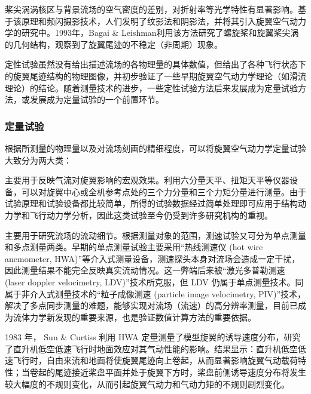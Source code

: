 桨尖涡涡核区与背景流场的空气密度的差别，对折射率等光学特性有显著影响。基于该原理和频闪摄影技术，人们发明了纹影法和阴影法，并将其引入旋翼空气动力学的研究中。1993年，Bagai
\& Leishman利用该方法研究了螺旋桨和旋翼桨尖涡的几何结构，观察到了旋翼尾迹的不稳定（非周期）现象。

定性试验虽然没有给出描述流场的各物理量的具体数值，但给出了各种飞行状态下的旋翼尾迹结构的物理图像，并初步验证了一些早期旋翼空气动力学理论（如滑流理论）的结论。随着测量技术的进步，一些定性试验方法后来发展成为定量试验方法，或发展成为定量试验的一个前置环节。

\subsubsection{定量试验}

根据所测量的物理量以及对流场刻画的精细程度，可以将旋翼空气动力学定量试验大致分为两大类：
\begin{description}[wide]
\item [{测力试验}] 主要用于反映气流对旋翼影响的宏观效果。利用六分量天平、扭矩天平等仪器设备，可以对旋翼中心或全机参考点处的三个力分量和三个力矩分量进行测量。由于试验原理和试验设备都比较简单，所得的试验数据经过简单处理即可应用于结构动力学和飞行动力学分析，因此这类试验至今仍受到许多研究机构的重视。
\item [{测速试验}] 主要用于研究流场的流动细节。根据测量对象的范围，测速试验又可分为单点测量和多点测量两类。早期的单点测量试验主要采用“热线测速仪
(hot wire anemometer, HWA)”等介入式测量设备，测速探头本身对流场会造成一定干扰，因此测量结果不能完全反映真实流动情况。这一弊端后来被“激光多普勒测速
(laser doppler velocimetry, LDV)”技术所克服，但
LDV 仍属于单点测量技术。同属于非介入式测量技术的“粒子成像测速 (particle image velocimetry, PIV)”技术，解决了多点同步测量的难题，能够实现对流场（流速）的高分辨率测量，目前已成为流体力学新发现的重要来源，也是验证数值计算方法的重要依据。
\end{description}

1983 年， Sun \& Curtiss 利用 HWA 定量测量了模型旋翼的诱导速度分布，研究了直升机低空低速飞行时地面效应对其气动性能的影响。结果显示：直升机低空低速飞行时，自由来流和地面将使旋翼尾迹向上卷起，从而显著影响旋翼气动载荷特性；当卷起的尾迹接近桨盘平面并处于旋翼下方时，桨盘前侧诱导速度分布将发生较大幅度的不规则变化，从而引起旋翼气动力和气动力矩的不规则剧烈变化。

